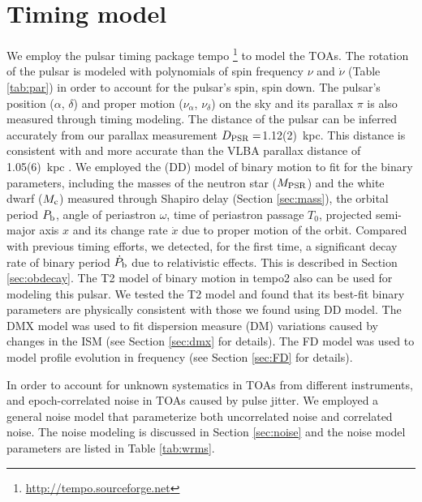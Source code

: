 \section{Timing model}
\label{sec:model}
We employ the pulsar timing package {\sc tempo}
\footnote{\url{http://tempo.sourceforge.net}} to model the TOAs. 
The rotation of the pulsar is modeled with polynomials of spin frequency 
$\nu$ and $\dot{\nu}$ (Table \ref{tab:par}) in order to account
for the pulsar's spin, spin down.
The pulsar's position ($\alpha$, $\delta$) and proper motion ($\nu_\alpha$, $
\nu_\delta$) on the sky and its parallax $\pi$ is also measured through timing modeling. 
The distance of the pulsar can be inferred accurately from our parallax
measurement $D_{\rm PSR}=$1.12(2)~kpc. This distance is consistent with and
more accurate than the VLBA parallax distance of 1.05(6)~kpc \citep{cbv+09}.
We employed the \citet{dd86} (DD) model of binary motion to fit for the binary parameters, 
including the masses of
the neutron star ($M_{\rm PSR}$) and the white dwarf ($M_{\rm c}$) measured
through Shapiro delay (Section \ref{sec:mass}),
the orbital period $P_{\rm b}$, angle of periastron $\omega$, time of
periastron passage $T_0$, projected semi-major axis $x$ and its change rate
$\dot{x}$ due to proper motion of the orbit. 
Compared with previous timing efforts, we detected, for the first time, a
significant decay rate of binary period $\dot{P}_{\rm b}$ due to relativistic
effects. This is described in Section \ref{sec:obdecay}.    
The T2 model of binary motion in {\sc tempo2} \citep{hem06} also can be used for modeling this pulsar. We tested the T2 model and found that its best-fit binary parameters are physically consistent with those we found using DD model.
The DMX model was used to fit dispersion measure (DM) variations caused by changes in the ISM (see Section \ref{sec:dmx} for details). The FD model was used to model profile
evolution in frequency (see Section \ref{sec:FD} for details). 

{\bfref
In order to account for unknown systematics in TOAs from different
instruments, and epoch-correlated noise in TOAs caused by pulse jitter. 
We employed a general noise model that parameterize both uncorrelated noise and
correlated noise. The noise modeling is discussed in Section \ref{sec:noise} and the
noise model parameters are listed in Table \ref{tab:wrms}. 
}

